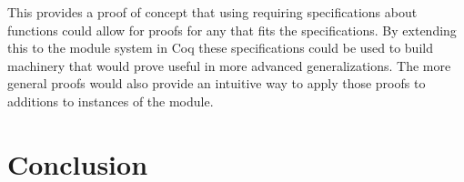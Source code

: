 \documentclass{llncs}
\begin{document}
This provides a proof of concept that using requiring specifications about functions could allow for proofs for any that fits the specifications.
By extending this to the module system in Coq these specifications could be used to build machinery that would prove useful in more advanced generalizations.  The more general proofs would also provide an intuitive way to apply those proofs to additions to instances of the module.


\section{Conclusion}






\end{document}
